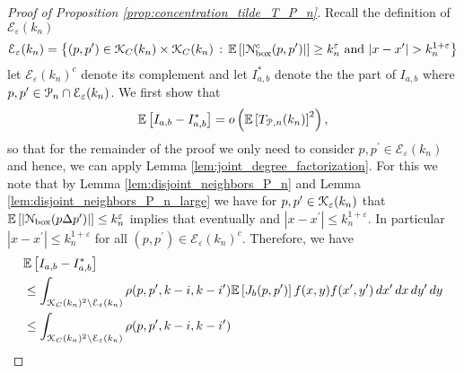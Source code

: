 \begin{proof}[Proof of Proposition \ref{prop:concentration_tilde_T_P_n}]

Recall the definition of $\mathcal{E}_\varepsilon(k_n)$
\[
	\mathcal{E}_{\varepsilon}(k_n) = \left\{(p,p^\prime) \in {\mathcal K}_C(k_n) \times {\mathcal K}_C(k_n) 
	\, : \, \mathbb{E}\left[\left|{\mathcal N}_{\text{box}}^c(p,p^\prime)\right|\right] \ge k_n^{\varepsilon} \text{ and } |x - x^\prime| > k_n^{1 + \varepsilon} \right\}
\]
let $\mathcal{E}_\varepsilon(k_n)^c$ denote its complement and let $I_{a,b}^\ast$ denote the the part of $I_{a,b}$ where $p,p^\prime \in {\mathcal P}_n \cap \mathcal{E}_\varepsilon(k_n)$. We first show that
\begin{equation}\label{eq:I_ab_ast_main}
	\mathbb{E}\left[I_{a,b} - I_{a,b}^\ast\right] = o\left(\mathbb{E}\left[T_{{\mathcal P},n}(k_n)\right]^2\right),
\end{equation}
so that for the remainder of the proof we only need to consider $p, p^\prime \in \mathcal{E}_\varepsilon(k_n)$ and hence, we can apply Lemma \ref{lem:joint_degree_factorization}. For this we note that by Lemma \ref{lem:disjoint_neighbors_P_n} and Lemma \ref{lem:disjoint_neighbors_P_n_large} we have for $p,p^\prime \in {\mathcal K}_{\varepsilon}(k_n)$ that $\mathbb{E}\left[\left|{\mathcal N}_{\text{box}}(p\Delta p^\prime)\right|\right] \le k_n^{\varepsilon}$ implies that eventually and $|x-x^\prime| \le k_n^{1+\varepsilon}$. In particular $|x - x^\prime| \le k_n^{1+\varepsilon}$ for all $(p, p^\prime) \in \mathcal{E}_{\varepsilon}(k_n)^c$. Therefore, we have
\begin{align*}
	&\Exp{I_{a,b} - I_{a,b}^\ast}\\
	&\le \int_{\Kcal_C(k_n)^2 \setminus \mathcal{E}_\varepsilon(k_n)} \rho(p, p^\prime, k - i, k - i^\prime) 
		\Exp{J_b(p,p^\prime)} f(x,y) f(x^\prime,y^\prime) \, dx^\prime \, dx \, dy^\prime \, dy\\
	&\le \int_{\Kcal_C(k_n)^2 \setminus \mathcal{E}_\varepsilon(k_n)} \rho(p, p^\prime, k - i, k - i^\prime) 

\end{align*}
\end{proof}
